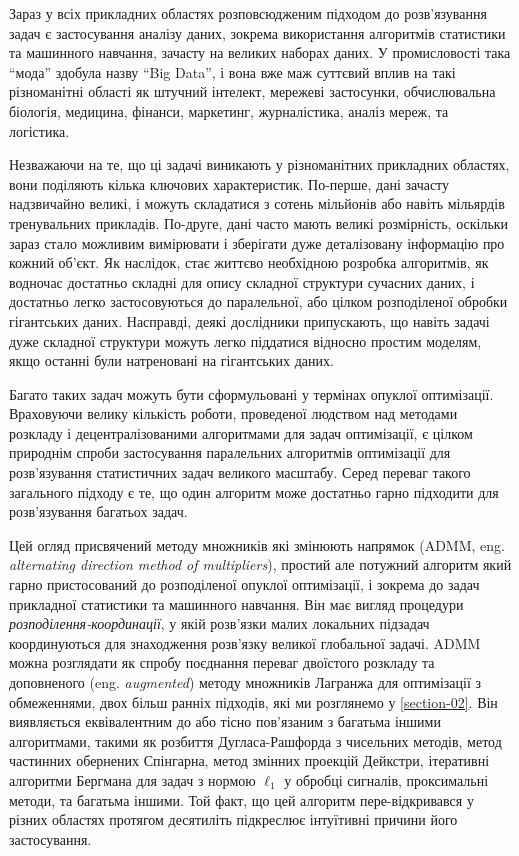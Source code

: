 Зараз у всіх прикладних областях розповсюдженим підходом до розв'язування задач є застосування аналізу даних, зокрема використання алгоритмів статистики та машинного навчання, зачасту на великих наборах даних. У промисловості така ``мода'' здобула назву ``Big Data'', і вона вже маж суттєвий вплив на такі різноманітні області як штучний інтелект, мережеві застосунки, обчислювальна біологія, медицина, фінанси, маркетинг, журналістика, аналіз мереж, та логістика. \medskip

Незважаючи на те, що ці задачі виникають у різноманітних прикладних областях, вони поділяють кілька ключових характеристик. По-перше, дані зачасту надзвичайно великі, і можуть складатися з сотень мільйонів або навіть мільярдів тренувальних прикладів. По-друге, дані часто мають великі розмірність, оскільки зараз стало можливим вимірювати і зберігати дуже деталізовану інформацію про кожний об'єкт. Як наслідок, стає життєво необхідною розробка алгоритмів, як водночас достатньо складні для опису складної структури сучасних даних, і достатньо легко застосовуються до паралельної, або цілком розподіленої обробки гігантських даних. Насправді, деякі дослідники \cite{92} припускають, що навіть задачі дуже складної структури можуть легко піддатися відносно простим моделям, якщо останні були натреновані на гігантських даних. \medskip

Багато таких задач можуть бути сформульовані у термінах опуклої оптимізації. Враховуючи велику кількість роботи, проведеної людством над методами розкладу і децентралізованими алгоритмами для задач оптимізації, є цілком природнім спроби застосування паралельних алгоритмів оптимізації для роз\-в'я\-зу\-ван\-ня статистичних задач великого масштабу. Серед переваг такого загального підходу є те, що один алгоритм може достатньо гарно підходити для розв'язування багатьох задач. \medskip

Цей огляд присвячений методу множників які змінюють напрямок (ADMM, eng. \textit{alternating direction method of multipliers}), простий але потужний алгоритм який гарно пристосований до розподіленої опуклої оптимізації, і зокрема до задач прикладної статистики та машинного навчання. Він має вигляд процедури \textit{розподілення-координації}, у якій розв'язки малих локальних підзадач координуються для знаходження розв'язку великої глобальної задачі. \allowbreak ADMM можна розглядати як спробу поєднання переваг двоїстого розкладу та доповненого (eng. \textit{augmented}) методу множників Лагранжа для оптимізації з обмеженнями, двох більш ранніх підходів, які ми розглянемо у \ref{section-02}. Він виявляється еквівалентним до або тісно пов'язаним з багатьма іншими алгоритмами, такими як розбиття Дугласа-Рашфорда з чисельних методів, метод частинних обернених Спінгарна, метод змінних проекцій Дейкстри, ітеративні алгоритми Бергмана для задач з нормою $\ell_1$ у обробці сигналів, проксимальні методи, та багатьма іншими. Той факт, що цей алгоритм пере-відкривався у різних областях протягом десятиліть підкреслює інтуїтивні причини його застосування. \medskip

